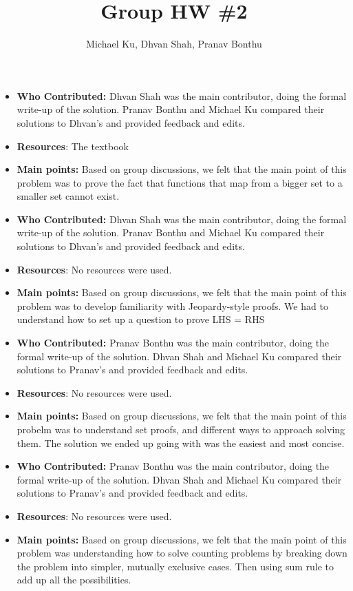 \documentclass[11pt]{article}
\begin{document}
\title{Group HW \#2}
\author{Michael Ku, Dhvan Shah, Pranav Bonthu}
\maketitle


\begin{itemize}
    \item \textbf{Who Contributed:} Dhvan Shah was the main contributor, doing the formal write-up of the solution. Pranav Bonthu and Michael Ku compared their solutions to Dhvan's and provided feedback and edits.
    \item \textbf{Resources}: The textbook
    \item \textbf{Main points:} Based on group discussions, we felt that the main point of this problem was to prove the fact that functions that map from a bigger set to a smaller set cannot exist.
\end{itemize}

\begin{itemize}
    \item \textbf{Who Contributed:} Dhvan Shah was the main contributor, doing the formal write-up of the solution. Pranav Bonthu and Michael Ku compared their solutions to Dhvan's and provided feedback and edits.
    \item \textbf{Resources}: No resources were used.
    \item \textbf{Main points:} Based on group discussions, we felt that the main point of this problem was to develop familiarity with Jeopardy-style proofs. We had to understand how to set up a question to prove LHS = RHS
\end{itemize}

\begin{itemize}
    \item \textbf{Who Contributed:} Pranav Bonthu was the main contributor, doing the formal write-up of the solution. Dhvan Shah and Michael Ku compared their solutions to Pranav's and provided feedback and edits.
    \item \textbf{Resources}: No resources were used.
    \item \textbf{Main points:} Based on group discussions, we felt that the main point of this probelm was to understand set proofs, and different ways to approach solving them. The solution we ended up going with was the easiest and most concise.
\end{itemize}

\begin{itemize}
    \item \textbf{Who Contributed:} Pranav Bonthu was the main contributor, doing the formal write-up of the solution. Dhvan Shah and Michael Ku compared their solutions to Pranav's and provided feedback and edits.
    \item \textbf{Resources}: No resources were used.
    \item \textbf{Main points:} Based on group discussions, we felt that the main point of this problem was understanding how to solve counting problems by breaking down the problem into simpler, mutually exclusive cases. Then using sum rule to add up all the possibilities.
\end{itemize}


\end{document}
